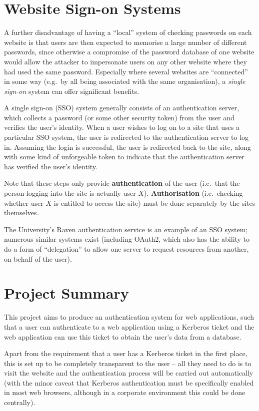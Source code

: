 \documentclass[12pt]{report}
\begin{document}
\section{Website Sign-on Systems}
A further disadvantage of having a ``local'' system of checking passwords on each website is that users are then expected to memorise a large number of different passwords, since otherwise a compromise of the password database of one website would allow the attacker to impersonate users on any other website where they had used the same password. Especially where several websites are ``connected'' in some way (e.g.\ by all being associated with the same organisation), a \textit{single sign-on} system can offer significant benefits.

A single sign-on (SSO) system generally consists of an authentication server, which collects a password (or some other security token) from the user and verifies the user's identity. When a user wishes to log on to a site that uses a particular SSO system, the user is redirected to the authentication server to log in. Assuming the login is successful, the user is redirected back to the site, along with some kind of unforgeable token to indicate that the authentication server has verified the user's identity.

Note that these steps only provide \textbf{authentication} of the user (i.e.\ that the person logging into the site is actually user $X$). \textbf{Authorisation} (i.e.\ checking whether user $X$ is entitled to access the site) must be done separately by the sites themselves.

The University's Raven authentication service is an example of an SSO system; numerous similar systems exist (including OAuth2, which also has the ability to do a form of ``delegation'' to allow one server to request resources from another, on behalf of the user\cite{Oracle-OAuth2}).

\section{Project Summary}
This project aims to produce an authentication system for web applications, such that a user can authenticate to a web application using a Kerberos ticket and the web application can use this ticket to obtain the user's data from a database.

Apart from the requirement that a user has a Kerberos ticket in the first place, this is set up to be completely transparent to the user -- all they need to do is to visit the website and the authentication process will be carried out automatically (with the minor caveat that Kerberos authentication must be specifically enabled in most web browsers, although in a corporate environment this could be done centrally).
\end{document}
